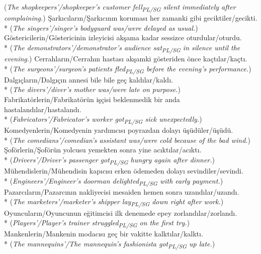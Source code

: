 ({\it The shopkeepers'/shopkeeper's customer fell\textsubscript{PL/SG} silent immediately after complaining.})
\ex \c{S}ark{\i}c{\i}lar{\i}n/\c{S}ark{\i}c{\i}n{\i}n korumas{\i} her zamanki gibi geciktiler/gecikti.\\*
({\it The singers'/singer's bodyguard was/were delayed as usual.})
\ex G\"{o}stericilerin/G\"{o}stericinin izleyicisi ak\c{s}ama kadar sessizce oturdular/oturdu.\\*
({\it The demonstrators'/demonstrator's audience sat\textsubscript{PL/SG} in silence until the evening.})
\ex Cerrahlar{\i}n/Cerrah{\i}n hastas{\i} ak\c{s}amki g\"{o}steriden \"{o}nce ka\c{c}t{\i}lar/ka\c{c}t{\i}.\\*
({\it The surgeons'/surgeon's patients fled\textsubscript{PL/SG} before the evening's performance.})
\ex Dalg{\i}\c{c}lar{\i}n/Dalg{\i}\c{c}{\i}n annesi bile bile ge\c{c} kald{\i}lar/kald{\i}.\\*
({\it The divers'/diver's mother was/were late on purpose.})
\ex Fabrikat\"{o}rlerin/Fabrikat\"{o}r\"{u}n i\c{s}\c{c}isi beklenmedik bir anda hastaland{\i}lar/hastaland{\i}.\\*
({\it Fabricators'/Fabricator's worker got\textsubscript{PL/SG} sick unexpectedly.})
\ex Komedyenlerin/Komedyenin yard{\i}mc{\i}s{\i} poyrazdan dolay{\i} \"{u}\c{s}\"{u}d\"{u}ler/\"{u}\c{s}\"{u}d\"{u}.\\*
({\it The comedians'/comedian's assistant was/were cold because of the bad wind.})
\ex \c{S}of\"{o}rlerin/\c{S}of\"{o}r\"{u}n yolcusu yemekten sonra yine ac{\i}kt{\i}lar/ac{\i}kt{\i}.\\*
({\it Drivers'/Driver's passenger got\textsubscript{PL/SG} hungry again after dinner.})
\ex M\"{u}hendislerin/M\"{u}hendisin kap{\i}c{\i}s{\i} erken \"{o}demeden dolay{\i} sevindiler/sevindi.\\*
({\it Engineers'/Engineer's doorman delighted\textsubscript{PL/SG} with early payment.})
\ex Pazarc{\i}lar{\i}n/Pazarc{\i}n{\i}n nakliyecisi mesaiden hemen sonra uzand{\i}lar/uzand{\i}.\\*
({\it The marketers'/marketer's shipper lay\textsubscript{PL/SG} down right after work.})
\ex Oyuncular{\i}n/Oyuncunun e\u{g}itimcisi ilk denemede epey zorland{\i}lar/zorland{\i}.\\*
({\it Players'/Player's trainer struggled\textsubscript{PL/SG} on the first try.})
\ex Mankenlerin/Mankenin modac{\i}s{\i} ge\c{c} bir vakitte kalkt{\i}lar/kalkt{\i}.\\*
({\it The mannequins'/The mannequin's fashionista got\textsubscript{PL/SG} up late.})

